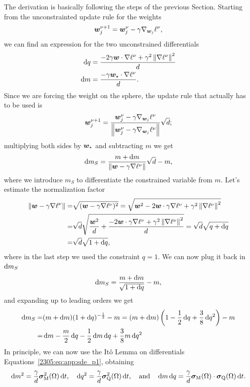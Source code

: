The derivation is basically following the steps of the previous Section.
Starting from the unconstrainted update rule for the weights
\[
    {\boldsymbol{w}}^{\nu+1}_j={\boldsymbol{w}}^{\nu}_j - \gamma \nabla_{{\boldsymbol{w}}_j}{\ell^\nu},
\]
we can find an expression for the two unconstrained differentials
\begin{equation}\begin{split}
  \dif q &= \frac{-2\gamma \w\cdot\nabla{\loss} + \gamma^2\left\|\nabla{\loss}\right\|^2}{d} \\
  \dif m &= \frac{-\gamma \w_\star\cdot\nabla\loss}{d}.
\end{split}\end{equation}
Since we are forcing the weight on the sphere, the update rule that actually has to be used is
\[
  {\boldsymbol{w}}^{\nu+1}_j =\frac{{\boldsymbol{w}}^{\nu}_j - \gamma \nabla_{{\boldsymbol{w}}_j}{\ell^\nu}}{\left\lVert {\boldsymbol{w}}^{\nu}_j - \gamma \nabla_{{\boldsymbol{w}}_j}{\ell^\nu} \right\rVert}\sqrt{d};
\]
multiplying both sides by \({\boldsymbol{w}}_\star\) and subtracting \(m\) we get
\[
  \dif m_S = \frac{m +\dif m}{\left\|\w - \gamma \nabla{\loss}\right\|}\sqrt{d} - m,
\]
where we introduce \(m_S\) to differentiate the constrained variable from \(m\).
Let's estimate the normalization factor
\[
  \begin{split}
  \left\|\w - \gamma \nabla{\loss}\right\| =& \sqrt{(\w - \gamma \nabla{\loss})^2}
                                           =  \sqrt{\w^2 - 2\w\cdot\gamma \nabla{\loss}+\gamma^2\left\|\nabla{\loss}\right\|^2} \\
                                           =& \sqrt{d}\sqrt{\frac{\w^2}{d} + \frac{- 2\w\cdot\gamma \nabla{\loss}+\gamma^2\left\|\nabla{\loss}\right\|^2}{d}}
                                           = \sqrt{d}\sqrt{q +\dif q} \\
                                           =& \sqrt{d}\sqrt{1 +\dif q},
  \end{split}
\]
where in the last step we used the constraint \(q=1\). We can now plug it back in \(\dif m_S\)
\[
  \dif m_S = \frac{m +\dif m}{\sqrt{1 +\dif q}} - m,
\]
and expanding up to leading orders we get
\[\begin{split}
  \dif m_S =& (m +\dif m)(1 +\dif q)^{-\frac12} - m = (m +\dif m)\left(1 -\frac12\dif q + \frac38\dif q^2\right)-m \\
           =& \dif m - \frac{m}{2}\dif q -\frac12 \dif m \dif q + \frac38 m \dif q^2
\end{split}\]
In principle, we can now use the Itô Lemma on differentials Equations~\eqref{2305:eq:app:sde_p1},
obtaining 
\[
  \dif m^2 =    \frac{\gamma}{d}\vec{\sigma}_\M^2{(\Omega)}\dif t, \quad
  \dif q^2 =    \frac{\gamma}{d}\vec{\sigma}^2_\Q{(\Omega)}\dif t, \quad\text{and}\quad
  \dif m \dif q = \frac{\gamma}{d}\vec{\sigma}_\M{(\Omega)} \cdot       \vec{\sigma}_\Q{(\Omega)} \dif t.
\]
